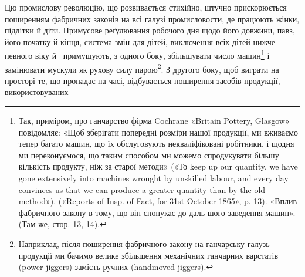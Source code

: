 Цю промислову революцію, що розвивається стихійно, штучно
прискорюється поширенням фабричних законів на всі галузі
промисловости, де працюють жінки, підлітки й діти. Примусове
реґулювання робочого дня щодо його довжини, павз, його початку
й кінця, система змін для дітей, виключення всіх дітей нижче
певного віку й~ примушують, з одного боку, збільшувати
число машин\footnote{
Так, приміром, про ганчарство фірма Cochrane «Britain Pottery,
Glasgow» повідомляє: «Щоб зберігати попередні розміри нашої продукції,
ми вживаємо тепер багато машин, що їх обслуговують некваліфіковані робітники,
і щодня ми переконуємося, що таким способом ми можемо спродукувати
більшу кількість продукту, ніж за старої методи» («То keep up
our quantity, we have gone extensively into machines wrought by unskilled
labour, and every day convinces us that we can produce a greater quantity
than by the old method»). («Reports of Insp. of Fact, for 31st October
1865», p. 13). «Вплив фабричного закону в тому, що він спонукає до даль
шого заведення машин». (Там же, стор. 13, 14).
} і замінювати мускули як рухову силу парою\footnote{
Наприклад, після поширення фабричного закону на ганчарську
галузь продукції ми бачимо велике збільшення механічних ганчарних
варстатів (power jiggers) замість ручних (handmoved jiggers).
}.
З другого боку, щоб виграти на просторі те, що пропадає на часі,
відбувається поширення засобів продукції, використовуваних
\parbreak{}  %
